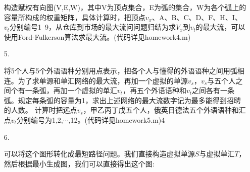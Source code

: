 \documentclass[a4paper,20pt]{article}
\begin{document}
\begin{itemize}
    构造赋权有向图(V,E,W)，其中V为顶点集合，E为弧的集合，W为各个弧上的容量所构成的权重矩阵，具体计算时，把顶点$v_x$、A、B、C、D、F、H、I、$v_t$分别编号1~9，从仓库到市场的最大流问问题归结为求$V_x$到$v_t$的最大流，可以使用Ford-Fulkerson算法求最大流。(代码详见homework4.m)
    \item[5.]
    \par 将5个人与5个外语语种分别用点表示，把各个人与懂得的外语语种之间用弧相连。为了求单源和单汇网络的最大流，再加一个虚拟的单源$v_s$，$v_s$与五个人之间个有一条弧，再加一个虚拟的单汇$v_t$，再五个外语语种和$v_t$之间各有一条弧。规定每条弧的容量为1，求出上述网络的最大流数字记为最多能得到招聘的人数。
    计算时把远点$v_s$，甲乙丙丁戊五个人，俄英日德法五个外语语种和汇点$v_t$分别编号为1,2,$\cdots$,12。(代码详见homework5.m)4
    \item[6.]
    \par 可以将这个图形转化成最短路径问题。我们直接构造虚拟单源$S$与虚拟单汇$T$，然后根据最小生成图，我们可以直接得出这个图:
\end{itemize}
\end{document}
